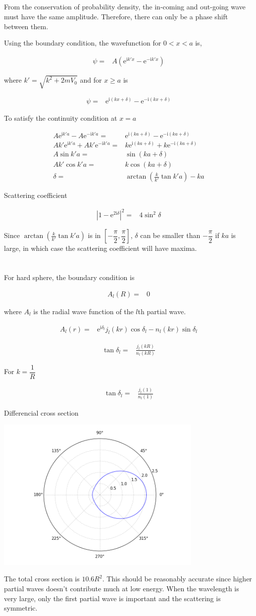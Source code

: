 \documentclass[10pt,fleqn]{article}
\newcommand{\ue}{\mathrm{e}}
\newcommand{\ui}{\mathrm{i}}
\newcommand{\eqar}[1]
{
  \begin{align*}
    #1
  \end{align*}
}
\newcommand{\paren}[1]{{\left({#1}\right)}}
\newcommand{\abs}[1]{{\left|{#1}\right|}}
\newcommand{\sqr}[1]{{\left[{#1}\right]}}
\begin{document}
\subsection{}
From the conservation of probability density,
the in-coming and out-going wave must have the same amplitude.
Therefore, there can only be a phase shift between them.

Using the boundary condition, the wavefunction for $0 < x < a$ is,
\eqar{
  \psi=&A\paren{\ue^{\ui k'x}-\ue^{-\ui k'x}}
}
where $k'=\sqrt{k^2+2mV_0}$ and for $x \geqslant a$ is
\eqar{
  \psi=&\ue^{\ui\paren{kx+\delta}}-\ue^{-\ui\paren{kx+\delta}}
}
To satisfy the continuity condition at $x=a$
\eqar{
  A\ue^{\ui k'a}-A\ue^{-\ui k'a}=&\ue^{\ui\paren{ka+\delta}}-\ue^{-\ui\paren{ka+\delta}}\\
  Ak'\ue^{\ui k'a}+Ak'\ue^{-\ui k'a}=&k\ue^{\ui\paren{ka+\delta}}+k\ue^{-\ui\paren{ka+\delta}}\\
  A\sin k'a=&\sin\paren{ka+\delta}\\
  Ak'\cos k'a=&k\cos\paren{ka+\delta}\\
  \delta=&\arctan\paren{\frac{k}{k'}\tan k'a}-ka
}
Scattering coefficient
\eqar{
  \abs{1-\ue^{2\ui\delta}}^2=&4\sin^2\delta
}
Since $\arctan\paren{\frac{k}{k'}\tan k'a}$ is in $\sqr{-\dfrac\pi2, \dfrac\pi2}$,
$\delta$ can be smaller than $-\dfrac\pi2$ if $ka$ is large, in which case the
scattering coefficient will have maxima.
\section{}
For hard sphere, the boundary condition is
\eqar{
  A_l\paren{R}=&0
}
where $A_l$ is the radial wave function of the $l$th partial wave.
\eqar{
  A_l\paren{r}=&\ue^{\ui\delta_l}j_l(kr)\cos\delta_l-n_l(kr)\sin\delta_l
}
\eqar{
  \tan\delta_l=&\frac{j_l\paren{kR}}{n_l\paren{kR}}
}
For $k=\dfrac1R$
\eqar{
  \tan\delta_l=&\frac{j_l\paren{1}}{n_l\paren{1}}
}
Differencial cross section
\begin{center}
  \includegraphics[width=10cm]{p5_3wave_kr1.png}
\end{center}
The total cross section is $10.6R^2$.
This should be reasonably accurate since higher partial waves doesn't contribute
much at low energy. When the wavelength is very large,
only the first partial wave is important and the scattering is symmetric.
\end{document}
